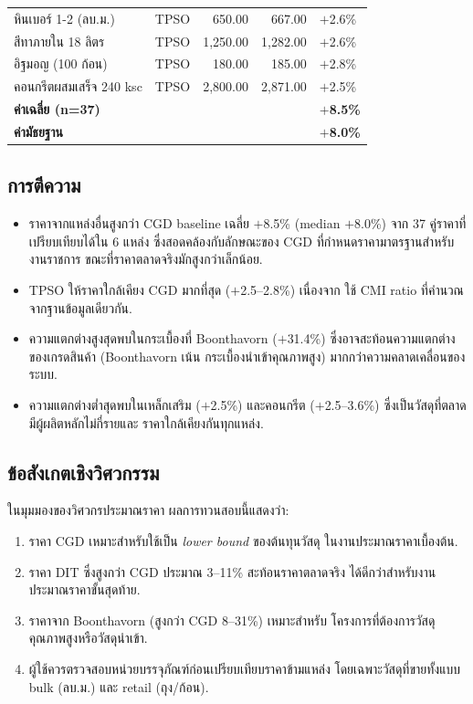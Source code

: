 \begin{table}[H]
\begin{tabular}{llrrl}
    หินเบอร์ 1-2 (ลบ.ม.)       & TPSO        & 650.00 & 667.00 & $+$2.6\% \\
    สีทาภายใน 18 ลิตร          & TPSO        & 1{,}250.00 & 1{,}282.00 & $+$2.6\% \\
    อิฐมอญ (100 ก้อน)          & TPSO        & 180.00 & 185.00 & $+$2.8\% \\
    คอนกรีตผสมเสร็จ 240 ksc   & TPSO        & 2{,}800.00 & 2{,}871.00 & $+$2.5\% \\
    \midrule
    \textbf{ค่าเฉลี่ย (n=37)} & & & & \textbf{$+$8.5\%} \\
    \textbf{ค่ามัธยฐาน} & & & & \textbf{$+$8.0\%} \\
    \bottomrule
  \end{tabular}
\end{table}

\subsection{การตีความ}

\begin{itemize}[leftmargin=2em]
  \item ราคาจากแหล่งอื่นสูงกว่า CGD baseline เฉลี่ย $+$8.5\%
        (median $+$8.0\%) จาก 37 คู่ราคาที่เปรียบเทียบได้ใน 6 แหล่ง
        ซึ่งสอดคล้องกับลักษณะของ CGD ที่กำหนดราคามาตรฐานสำหรับงานราชการ
        ขณะที่ราคาตลาดจริงมักสูงกว่าเล็กน้อย.
  \item TPSO ให้ราคาใกล้เคียง CGD มากที่สุด ($+$2.5--2.8\%) เนื่องจาก
        ใช้ CMI ratio ที่คำนวณจากฐานข้อมูลเดียวกัน.
  \item ความแตกต่างสูงสุดพบในกระเบื้องที่ Boonthavorn ($+$31.4\%)
        ซึ่งอาจสะท้อนความแตกต่างของเกรดสินค้า (Boonthavorn เน้น
        กระเบื้องนำเข้าคุณภาพสูง) มากกว่าความคลาดเคลื่อนของระบบ.
  \item ความแตกต่างต่ำสุดพบในเหล็กเสริม ($+$2.5\%) และคอนกรีต
        ($+$2.5--3.6\%) ซึ่งเป็นวัสดุที่ตลาดมีผู้ผลิตหลักไม่กี่รายและ
        ราคาใกล้เคียงกันทุกแหล่ง.
\end{itemize}

\subsection{ข้อสังเกตเชิงวิศวกรรม}

ในมุมมองของวิศวกรประมาณราคา ผลการทวนสอบนี้แสดงว่า:
\begin{enumerate}[leftmargin=2em]
  \item ราคา CGD เหมาะสำหรับใช้เป็น \emph{lower bound} ของต้นทุนวัสดุ
        ในงานประมาณราคาเบื้องต้น.
  \item ราคา DIT ซึ่งสูงกว่า CGD ประมาณ 3--11\% สะท้อนราคาตลาดจริง
        ได้ดีกว่าสำหรับงานประมาณราคาขั้นสุดท้าย.
  \item ราคาจาก Boonthavorn (สูงกว่า CGD 8--31\%) เหมาะสำหรับ
        โครงการที่ต้องการวัสดุคุณภาพสูงหรือวัสดุนำเข้า.
  \item ผู้ใช้ควรตรวจสอบหน่วยบรรจุภัณฑ์ก่อนเปรียบเทียบราคาข้ามแหล่ง
        โดยเฉพาะวัสดุที่ขายทั้งแบบ bulk (ลบ.ม.) และ retail (ถุง/ก้อน).
\end{enumerate}
